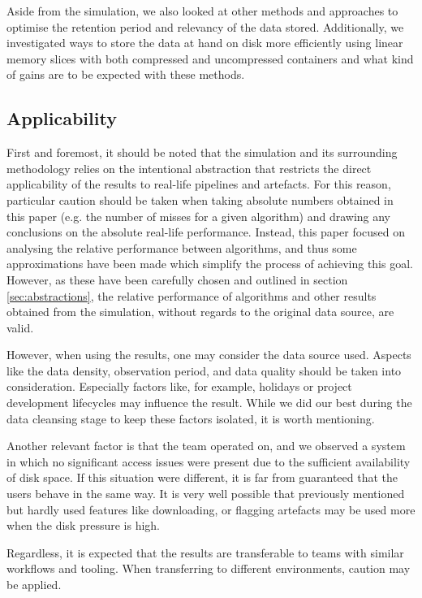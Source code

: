    Aside from the simulation, we also looked at other methods and approaches to optimise the retention period and relevancy of the data stored. Additionally, we investigated ways to store the data at hand on disk more efficiently using linear memory slices with both compressed and uncompressed containers and what kind of gains are to be expected with these methods.

    \subsection{Applicability}
        First and foremost, it should be noted that the simulation and its surrounding methodology relies on the intentional abstraction that restricts the direct applicability of the results to real-life pipelines and artefacts. For this reason, particular caution should be taken when taking absolute numbers obtained in this paper (e.g. the number of misses for a given algorithm) and drawing any conclusions on the absolute real-life performance. Instead, this paper focused on analysing the relative performance between algorithms, and thus some approximations have been made which simplify the process of achieving this goal. However, as these have been carefully chosen and outlined in section \ref{sec:abstractions}, the relative performance of algorithms and other results obtained from the simulation, without regards to the original data source, are valid.
        
        However, when using the results, one may consider the data source used. Aspects like the data density, observation period, and data quality should be taken into consideration. Especially factors like, for example, holidays or project development lifecycles may influence the result. While we did our best during the data cleansing stage to keep these factors isolated, it is worth mentioning.
        
        Another relevant factor is that the team operated on, and we observed a system in which no significant access issues were present due to the sufficient availability of disk space. If this situation were different, it is far from guaranteed that the users behave in the same way. It is very well possible that previously mentioned but hardly used features like downloading, or flagging artefacts may be used more when the disk pressure is high.
        
        Regardless, it is expected that the results are transferable to teams with similar workflows and tooling. When transferring to different environments, caution may be applied.
        
